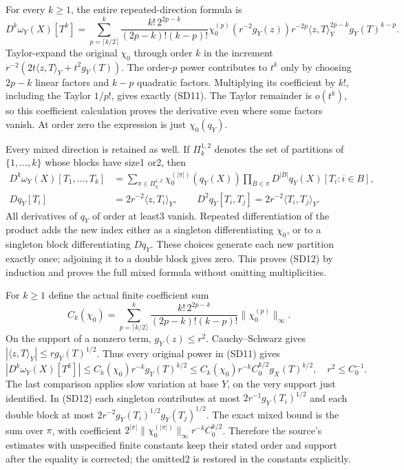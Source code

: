 \documentclass[
  11pt,
]{article}
\begin{document}
For every \(k\ge1\), the entire repeated-direction formula is \[
 D^k\omega_Y(X)[T^k]
 =\sum_{p=\lceil k/2\rceil}^{k}
 \frac{k!\,2^{2p-k}}{(2p-k)!(k-p)!}
 \chi_0^{(p)}(r^{-2}g_Y(z))r^{-2p}
 \langle z,T\rangle_Y^{2p-k}g_Y(T)^{k-p}.
 \tag{SD11}
\] Taylor-expand the original \(\chi_0\) through order \(k\) in the
increment \(r^{-2}(2t\langle z,T\rangle_Y+t^2g_Y(T))\). The order-\(p\)
power contributes to \(t^k\) only by choosing \(2p-k\) linear factors
and \(k-p\) quadratic factors. Multiplying its coefficient by \(k!\),
including the Taylor \(1/p!\), gives exactly (SD11). The Taylor
remainder is \(o(t^k)\), so this coefficient calculation proves the
derivative even where some factors vanish. At order zero the expression
is just \(\chi_0(q_Y)\).

Every mixed direction is retained as well. If \(\Pi_k^{1,2}\) denotes
the set of partitions of \(\{1,\ldots,k\}\) whose blocks have size1 or2,
then \[
 \begin{aligned}
 D^k\omega_Y(X)[T_1,\ldots,T_k]
 &=\sum_{\pi\in\Pi_k^{1,2}}\chi_0^{(|\pi|)}(q_Y(X))
       \prod_{B\in\pi}D^{|B|}q_Y(X)[T_i:i\in B],\\
 Dq_Y[T_i]&=2r^{-2}\langle z,T_i\rangle_Y,
 \qquad D^2q_Y[T_i,T_j]=2r^{-2}\langle T_i,T_j\rangle_Y.
 \end{aligned}
 \tag{SD12}
\] All derivatives of \(q_Y\) of order at least3 vanish. Repeated
differentiation of the product adds the new index either as a singleton
differentiating \(\chi_0\), or to a singleton block differentiating
\(Dq_Y\). These choices generate each new partition exactly once;
adjoining it to a double block gives zero. This proves (SD12) by
induction and proves the full mixed formula without omitting
multiplicities.

For \(k\ge1\) define the actual finite coefficient sum \[
 C_k(\chi_0)=\sum_{p=\lceil k/2\rceil}^{k}
 \frac{k!\,2^{2p-k}}{(2p-k)!(k-p)!}\|\chi_0^{(p)}\|_\infty.
 \tag{SD13}
\] On the support of a nonzero term, \(g_Y(z)\le r^2\). Cauchy--Schwarz
gives \(|\langle z,T\rangle_Y|\le r g_Y(T)^{1/2}\). Thus every original
power in (SD11) gives \[
 |D^k\omega_Y(X)[T^k]|
 \le C_k(\chi_0)r^{-k}g_Y(T)^{k/2}
 \le C_k(\chi_0)r^{-k}C_0^{k/2}g_X(T)^{k/2},
 \quad r^2\le C_0^{-1}.
 \tag{SD14}
\] The last comparison applies slow variation at base \(Y\), on the very
support just identified. In (SD12) each singleton contributes at most
\(2r^{-1}g_Y(T_i)^{1/2}\) and each double block at most
\(2r^{-2}g_Y(T_i)^{1/2}g_Y(T_j)^{1/2}\). The exact mixed bound is the
sum over \(\pi\), with coefficient
\(2^{|\pi|}\|\chi_0^{(|\pi|)}\|_\infty r^{-k}C_0^{k/2}\). Therefore the
source's estimates with unspecified finite constants keep their stated
order and support after the equality is corrected; the omitted2 is
restored in the constants explicitly.
\end{document}
